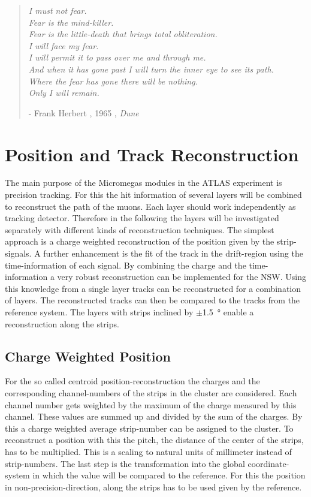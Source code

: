 \documentclass[
twoside,            %
BCOR1.4cm,          %
10pt,               %
headings=normal,    %
headsepline,        %
clearplainpage,		%
final,              %
div=14,
open=right,
bibliography=toc
]{scrreprt}
\begin{document}
\vspace*{\fill} 
\begin{quote} 
	\textit{
		I must not fear.
		\\
		Fear is the mind-killer.
		\\
		Fear is the little-death that brings total obliteration.
		\\
		I will face my fear.
		\\
		I will permit it to pass over me and through me.
		\\
		And when it has gone past I will turn the inner eye to see its path.
		\\
		Where the fear has gone there will be nothing.
		\\
		Only I will remain.
	}
	
	\hfill - Frank Herbert , 1965 , \textit{Dune}
\end{quote}
\vspace*{\fill}

\chapter{Position and Track Reconstruction}

The main purpose of the Micromegas modules in the ATLAS experiment is precision tracking.
For this the hit information of several layers will be combined to reconstruct the path of the muons.
Each layer should work independently as tracking detector.
Therefore in the following the layers will be investigated separately with different kinds of reconstruction techniques.
The simplest approach is a charge weighted reconstruction of the position given by the strip-signals.
A further enhancement is the fit of the track in the drift-region using the time-information of each signal.
By combining the charge and the time-information a very robust reconstruction can be implemented for the NSW.
Using this knowledge from a single layer tracks can be reconstructed for a combination of layers.
The reconstructed tracks can then be compared to the tracks from the reference system.
The layers with strips inclined by $\pm$\SI{1.5}{\degree} enable a reconstruction along the strips.

\section{Charge Weighted Position}

For the so called centroid position-reconstruction the charges and the corresponding channel-numbers of the strips in the cluster are considered.
Each channel number gets weighted by the maximum of the charge measured by this channel.
These values are summed up and divided by the sum of the charges.
By this a charge weighted average strip-number can be assigned to the cluster.
To reconstruct a position with this the pitch, the distance of the center of the strips, has to be multiplied.
This is a scaling to natural units of millimeter instead of strip-numbers.
The last step is the transformation into the global coordinate-system in which the value will be compared to the reference.
For this the position in non-precision-direction, along the strips has to be used given by the reference.
\end{document}
